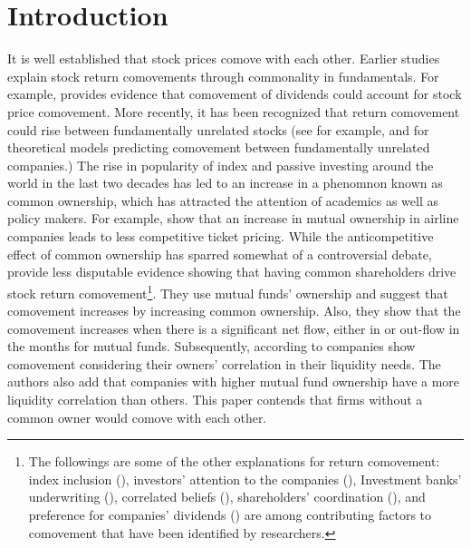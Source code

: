 \section{Introduction}

It is well established that stock prices comove with each other. Earlier studies explain stock return comovements through commonality in fundamentals. For example, \cite{shiller1989comovements} provides evidence that comovement of dividends could account for stock price comovement. More recently, it has been recognized that return comovement could rise between fundamentally unrelated stocks (see for example, {\cite{barberis2003style} and \cite{barberis2005comovement}} for theoretical models predicting comovement between fundamentally unrelated companies.) The rise in popularity of index and passive investing around the world in the last two decades has led to an increase in a phenomnon known as common ownership, which has attracted the attention of academics as well as policy makers. For example, \cite{azar2018anticompetitive} show that an increase in mutual ownership in airline companies leads to less competitive ticket pricing. While the anticompetitive effect of common ownership has sparred somewhat of a controversial debate, {\cite{AntonPolk}} provide less disputable evidence showing that having common shareholders drive stock return comovement\footnote{The followings are some of the other explanations for return comovement: index inclusion ({\cite{barberis2005comovement}}), investors' attention to the companies ({\cite{wu2014investor}}), Investment banks' underwriting ({\cite{grullon2014comovement}}), correlated beliefs ({\cite{david2016correlated}}), shareholders' coordination ({\cite{pantzalis2017shareholder}}), and preference for companies' dividends ({\cite{HAMEED2019103}}) are among contributing factors to comovement that have been identified by researchers.}. They use mutual funds' ownership and suggest that comovement increases by increasing common ownership. Also, they show that the comovement increases when there is a significant net flow, either in or out-flow in the months for mutual funds.
Subsequently, according to {\cite{Liquidity2016}} companies show comovement considering their owners' correlation in their liquidity needs. The authors also add that companies with higher mutual fund ownership have a more liquidity correlation than others. This paper contends that firms without a common owner would comove with each other. 
	
